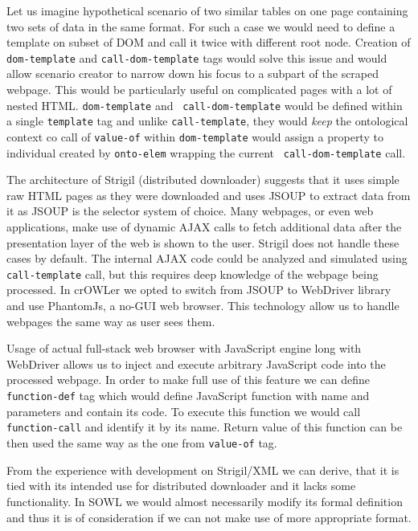 Let us imagine hypothetical scenario of two similar tables on one page
containing two sets of data in the same format. For such a case we would need
to define a template on subset of DOM and call it twice with different root
node. Creation of {\tt dom-template} and {\tt call-dom-template} tags would
solve this issue and would allow scenario creator to narrow down his focus to a
subpart of the scraped webpage. This would be particularly useful on
complicated pages with a lot of nested HTML. {\tt dom-template} and {\tt
call-dom-template} would be defined within a single {\tt template} tag and
unlike {\tt call-template}, they would {\em keep} the ontological context co
call of {\tt value-of} within {\tt dom-template} would assign a property to
individual created by {\tt onto-elem} wrapping the current {\tt
call-dom-template} call. 

The architecture of Strigil (distributed downloader) suggests that it uses
simple raw HTML pages as they were downloaded and uses JSOUP to extract data
from it as JSOUP is the selector system of choice. Many webpages, or even web
applications, make use of dynamic AJAX calls to fetch additional data after the
presentation layer of the web is shown to the user. Strigil does not handle
these cases by default. The internal AJAX code could be analyzed and simulated
using {\tt call-template} call, but this requires deep knowledge of the webpage
being processed. In crOWLer we opted to switch from JSOUP to WebDriver library
and use PhantomJs, a no-GUI web browser. This technology allow us to handle
webpages the same way as user sees them. 

Usage of actual full-stack web browser with JavaScript engine long with
WebDriver allows us to inject and execute arbitrary JavaScript code into the
processed webpage. In order to make full use of this feature we can define {\tt
function-def} tag which would define JavaScript function with name and
parameters and contain its code. To execute this function we would call {\tt
function-call} and identify it by its name. Return value of this function can
be then used the same way as the one from {\tt value-of} tag. 

From the experience with development on Strigil/XML we can derive, that it is
tied with its intended use for distributed downloader and it lacks some
functionality. In SOWL we would almost necessarily modify its formal definition
and thus it is of consideration if we can not make use of more appropriate
format. 


